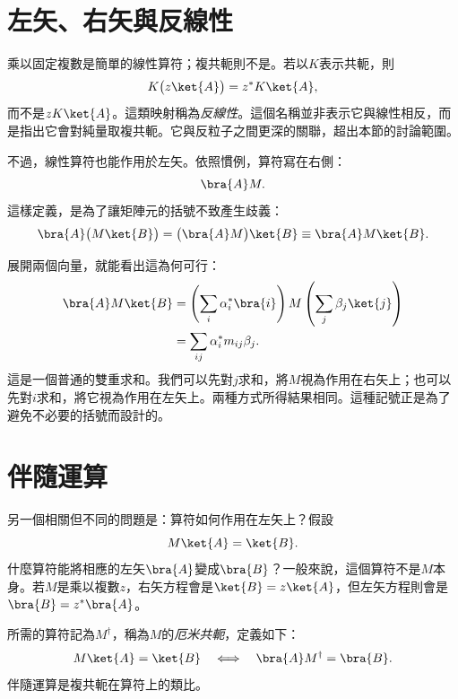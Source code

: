 \section{左矢、右矢與反線性}

\begin{classroomqa}
\end{classroomqa}

乘以固定複數是簡單的線性算符；複共軛則不是。若以\(K\)表示共軛，則
\[
K\bigl(z\ket{A}\bigr)=z^*K\ket{A},
\]
而不是\(zK\ket{A}\)。這類映射稱為\emph{反線性}。這個名稱並非表示它與線性相反，而是指出它會對純量取複共軛。它與反粒子之間更深的關聯，超出本節的討論範圍。

不過，線性算符也能作用於左矢。依照慣例，算符寫在右側：
\begin{equation}
\bra{A}M.
\end{equation}
這樣定義，是為了讓矩陣元的括號不致產生歧義：
\begin{equation}
\bra{A}\bigl(M\ket{B}\bigr)
=
\bigl(\bra{A}M\bigr)\ket{B}
\equiv
\bra{A}M\ket{B}.
\label{eq:bracket-independence}
\end{equation}

展開兩個向量，就能看出這為何可行：
\begin{align}
\bra{A}M\ket{B}
 &=\left(\sum_i\alpha_i^*\bra{i}\right)
   M
   \left(\sum_j\beta_j\ket{j}\right)\\
 &=\sum_{ij}\alpha_i^*m_{ij}\beta_j.
\label{eq:matrix-element-double-sum}
\end{align}
這是一個普通的雙重求和。我們可以先對\(j\)求和，將\(M\)視為作用在右矢上；也可以先對\(i\)求和，將它視為作用在左矢上。兩種方式所得結果相同。這種記號正是為了避免不必要的括號而設計的。

\section{伴隨運算}

另一個相關但不同的問題是：算符如何作用在左矢上？假設
\[
M\ket{A}=\ket{B}.
\]
什麼算符能將相應的左矢\(\bra{A}\)變成\(\bra{B}\)？一般來說，這個算符不是\(M\)本身。若\(M\)是乘以複數\(z\)，右矢方程會是\(\ket{B}=z\ket{A}\)，但左矢方程則會是\(\bra{B}=z^*\bra{A}\)。

所需的算符記為\(M^\dagger\)，稱為\(M\)的\emph{厄米共軛}，定義如下：
\begin{equation}
M\ket{A}=\ket{B}
\quad\Longleftrightarrow\quad
\bra{A}M^\dagger=\bra{B}.
\label{eq:dagger-definition}
\end{equation}
伴隨運算是複共軛在算符上的類比。

